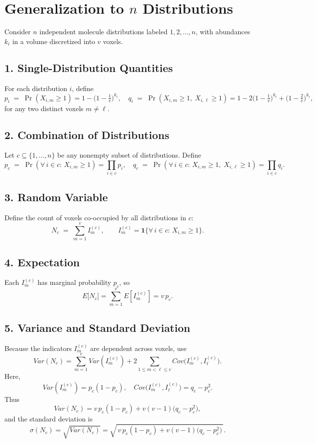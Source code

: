 \documentclass{article}
\begin{document}
\newpage
\section*{Generalization to \(n\) Distributions}

Consider \(n\) independent molecule distributions labeled \(1,2,\dots,n\), with abundances \(k_i\) in a volume discretized into \(v\) voxels.

\subsection*{1. Single-Distribution Quantities}

For each distribution \(i\), define
\[
p_i \;=\;\Pr(X_{i,m}\ge1)
=1-\bigl(1-\tfrac1v\bigr)^{k_i},
\quad
q_i \;=\;\Pr(X_{i,m}\ge1,\;X_{i,\ell}\ge1)
=1 - 2\bigl(1-\tfrac1v\bigr)^{k_i} + \bigl(1-\tfrac2v\bigr)^{k_i},
\]
for any two distinct voxels \(m\neq\ell\).

\subsection*{2. Combination of Distributions}

Let \(c\subseteq\{1,\dots,n\}\) be any nonempty subset of distributions.  Define
\[
p_c \;=\;\Pr(\forall\,i\in c:\,X_{i,m}\ge1)
=\prod_{i\in c} p_i,
\quad
q_c \;=\;\Pr(\forall\,i\in c:\,X_{i,m}\ge1,\;X_{i,\ell}\ge1)
=\prod_{i\in c} q_i.
\]

\subsection*{3. Random Variable}

Define the count of voxels co-occupied by all distributions in \(c\):
\[
N_c \;=\;\sum_{m=1}^v I^{(c)}_m,
\qquad
I^{(c)}_m = \mathbf{1}\{\forall\,i\in c:\,X_{i,m}\ge1\}.
\]

\subsection*{4. Expectation}

Each \(I^{(c)}_m\) has marginal probability \(p_c\), so
\[
E\bigl[N_c\bigr]
= \sum_{m=1}^v E[I^{(c)}_m]
= v\,p_c.
\]

\subsection*{5. Variance and Standard Deviation}

Because the indicators \(I^{(c)}_m\) are dependent across voxels, use
\[
Var(N_c)
= \sum_{m=1}^v Var(I^{(c)}_m)
  + 2\sum_{1\le m<\ell\le v} Cov\bigl(I^{(c)}_m, I^{(c)}_\ell\bigr).
\]
Here,
\[
Var(I^{(c)}_m) = p_c(1-p_c),
\quad
Cov\bigl(I^{(c)}_m, I^{(c)}_\ell\bigr) = q_c - p_c^2.
\]
Thus
\[
Var(N_c)
= v\,p_c(1-p_c)
  + v(v-1)\bigl(q_c - p_c^2\bigr),
\]
and the standard deviation is
\[
\sigma(N_c)
= \sqrt{Var(N_c)} 
= \sqrt{\,v\,p_c(1-p_c) + v(v-1)\bigl(q_c - p_c^2\bigr)\,}.
\]


\begin{figure}[h]
\centering
\end{figure}
\end{document}
